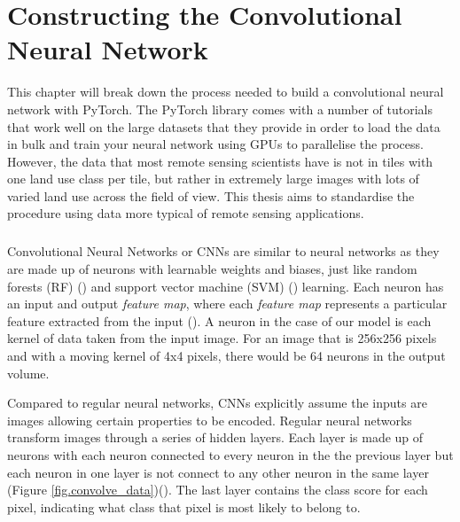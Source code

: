 \chapter{Constructing the Convolutional Neural Network }
This chapter will break down the process needed to build a convolutional neural network with PyTorch. The PyTorch library comes with a number of tutorials that work well on the large datasets that they provide in order to load the data in bulk and train your neural network using GPUs to parallelise the process. However, the data that most remote sensing scientists have is not in tiles with one land use class per tile, but rather in extremely large images with lots of varied land use across the field of view. This thesis aims to standardise the procedure using data more typical of remote sensing applications.
\paragraph{}
Convolutional Neural Networks or CNNs are similar to neural networks as they are made up of neurons with learnable weights and biases, just like random forests (RF) (\cite{belgiu16,Breiman01}) and support vector machine (SVM) (\cite{cortes95,mountrakis11,vapnik82}) learning. Each neuron has an input and output \textit{feature map}, where each \textit{feature map} represents a particular feature extracted from the input (\cite{lecun10}). A neuron in the case of our model is each kernel of data taken from the input image. For an image that is 256x256 pixels and with a moving kernel of 4x4 pixels, there would be 64 neurons in the output volume. 
\par 
Compared to regular neural networks, CNNs explicitly assume the inputs are images allowing certain properties to be encoded. Regular neural networks transform images through a series of hidden layers. Each layer is made up of neurons with each neuron connected to every neuron in the the previous layer but each neuron in one layer is not connect to any other neuron in the same layer (Figure \ref{fig.convolve_data})(\cite{karpathy_cnn1}). The last layer contains the class score for each pixel, indicating what class that pixel is most likely to belong to. 
\par 
